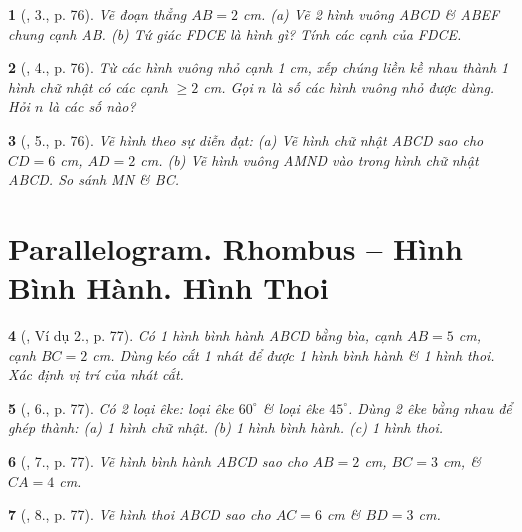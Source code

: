 \documentclass{article}
\newtheorem{baitoan}{}
\begin{document}
\begin{baitoan}[\cite{Tuyen_Toan_6}, 3., p. 76]
	Vẽ đoạn thẳng $AB = 2$ {\rm cm}. (a) Vẽ 2 hình vuông ABCD \& ABEF chung cạnh AB. (b) Tứ giác FDCE là hình gì? Tính các cạnh của FDCE.
\end{baitoan}

\begin{baitoan}[\cite{Tuyen_Toan_6}, 4., p. 76]
	Từ các hình vuông nhỏ cạnh {\rm1 cm}, xếp chúng liền kề nhau thành 1 hình chữ nhật có các cạnh $\ge2$ {\rm cm}. Gọi $n$ là số các hình vuông nhỏ được dùng. Hỏi $n$ là các số nào?
\end{baitoan}

\begin{baitoan}[\cite{Tuyen_Toan_6}, 5., p. 76]
	Vẽ hình theo sự diễn đạt: (a) Vẽ hình chữ nhật ABCD sao cho $CD = 6$ {\rm cm}, $AD = 2$ {\rm cm}. (b) Vẽ hình vuông AMND vào trong hình chữ nhật ABCD. So sánh MN \& BC.
\end{baitoan}


\section{Parallelogram. Rhombus -- Hình Bình Hành. Hình Thoi}

\begin{baitoan}[\cite{Tuyen_Toan_6}, Ví dụ 2., p. 77]
	Có 1 hình bình hành ABCD bằng bìa, cạnh $AB = 5$ {\rm cm}, cạnh $BC = 2$ {\rm cm}. Dùng kéo cắt 1 nhát để được 1 hình bình hành \& 1 hình thoi. Xác định vị trí của nhát cắt.
\end{baitoan}

\begin{baitoan}[\cite{Tuyen_Toan_6}, 6., p. 77]
	Có 2 loại êke: loại êke $60^\circ$ \& loại êke $45^\circ$. Dùng 2 êke bằng nhau để ghép thành: (a) 1 hình chữ nhật. (b) 1 hình bình hành. (c) 1 hình thoi.
\end{baitoan}

\begin{baitoan}[\cite{Tuyen_Toan_6}, 7., p. 77]
	Vẽ hình bình hành ABCD sao cho $AB = 2$ {\rm cm}, $BC = 3$ {\rm cm}, \& $CA = 4$ {\rm cm}.
\end{baitoan}

\begin{baitoan}[\cite{Tuyen_Toan_6}, 8., p. 77]
	Vẽ hình thoi ABCD sao cho $AC = 6$ {\rm cm} \& $BD = 3$ {\rm cm}.
\end{baitoan}
\end{document}
